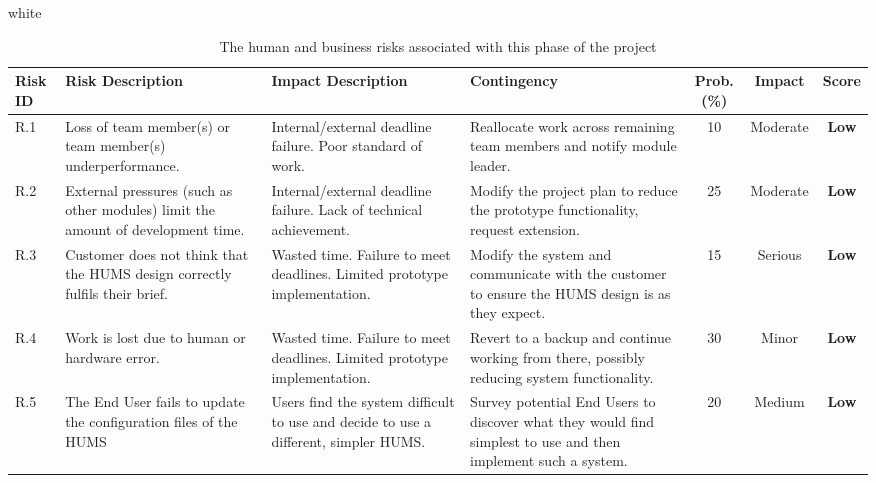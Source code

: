 \documentclass[10pt,a4paper]{article}
\newcommand{\tableformat}[4]{
\begin{table}[t]
\centering
  \rowcolors{2}{gray!10} {white}
\begin{tabular}{#1}
  \hline
  \rowcolor[gray]{0.9} #2
\end{tabular}
\caption{#3}
\label{#4}
\end{table}}
\begin{document}
\tableformat{p{0.8cm} p{3cm} p{3cm} p{3cm} c c c }
{ 	\hline
  	Risk ID & Risk Description & Impact Description & Contingency & Prob.(\%) & Impact & Score \\
  	\hline
  
    R.1 & Loss of team member(s) or team member(s) underperformance. & Internal/external deadline failure. Poor standard of work. & Reallocate work across remaining team members and notify module leader. & 10 & Moderate & \textbf{Low} \\
    R.2 & External pressures (such as other modules) limit the amount of development time. & Internal/external deadline failure. Lack of technical achievement. & Modify the project plan to reduce the prototype functionality, request extension. & 25 & Moderate &  \textbf{Low} \\
    R.3 & Customer does not think that the HUMS design correctly fulfils their brief. & Wasted time. Failure to meet deadlines. Limited prototype implementation. & Modify the system and communicate with the customer to ensure the HUMS design is as they expect. & 15 & Serious &  \textbf{Low} \\
    R.4 & Work is lost due to human or hardware error. & Wasted time. Failure to meet deadlines. Limited prototype implementation. & Revert to a backup and continue working from there, possibly reducing system functionality. & 30 & Minor &  \textbf{Low} \\
    R.5 & The End User fails to update the configuration files of the HUMS  & Users find the system difficult to use and decide to use a different, simpler HUMS. & Survey potential End Users to discover what they would find simplest to use and then implement such a system. & 20 & Medium & \textbf{Low} \\	
  	\hline
}
{The human and business risks associated with this phase of the project}{tab:human_risks}
\end{document}

